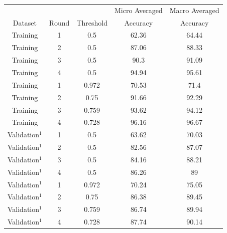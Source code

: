 \documentclass{report}
\theoremstyle{definition}
\theoremstyle{remark}
\begin{document}
\vspace*{-3cm}\begin{table}[H]
    \centering
   \begin{tabular}{ccccc}
    &&&Micro Averaged & Macro Averaged\\
    Dataset & Round & Threshold     & Accuracy &Accuracy\\
    \hline
    Training & 1 & 0.5 & 62.36&64.44\\
    Training & 2 & 0.5 & 87.06&88.33\\
    Training & 3 & 0.5 & 90.3&91.09\\
    Training & 4 & 0.5 & 94.94&95.61\\
    \hline
    Training & 1 & 0.972&70.53&71.4 \\
    Training & 2 & 0.75 &91.66&92.29\\
    Training & 3 & 0.759&93.62&94.12 \\
    Training & 4 & 0.728&96.16&96.67 \\
    \hline
    Validation$^1$ & 1 & 0.5&63.62&70.03 \\
    Validation$^1$ & 2 & 0.5&82.56&87.07 \\
    Validation$^1$ & 3 & 0.5&84.16&88.21 \\
    Validation$^1$ & 4 & 0.5&86.26&89 \\
    \hline
    Validation$^1$ & 1 & 0.972&70.24&75.05\\
    Validation$^1$ & 2 & 0.75 &86.38&89.45\\
    Validation$^1$ & 3 & 0.759&86.74&89.94\\
    Validation$^1$ & 4 & 0.728&87.74&90.14\\
    \end{tabular}
    

\end{table}
\end{document}
